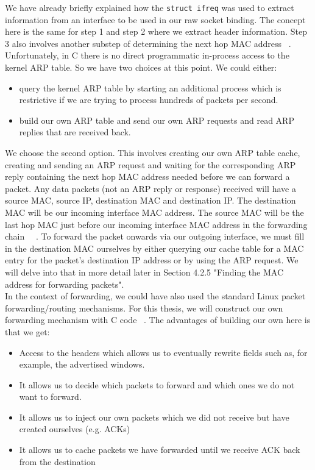 We have already briefly explained how the {\tt struct ifreq} was used to extract information from an interface to be used in our raw socket binding. The concept here is the same for step 1 and step 2 where we extract header information. Step 3 also involves another substep of determining the next hop MAC address ~\cite{40}. Unfortunately, in C there is no direct programmatic in-process access to the kernel ARP table. So we have two choices at this point. We could either:\\

\begin{itemize}
\item query the kernel ARP table by starting an additional process which is restrictive if we are trying to process hundreds of packets per second. 
\item build our own ARP table and send our own ARP requests and read ARP replies that are received back.\\
\end{itemize}

We choose the second option. This involves creating our own ARP table cache, creating and sending an ARP request and waiting for the corresponding ARP reply containing the next hop MAC address needed before we can forward a packet. Any data packets (not an ARP reply or response) received will have a source MAC, source IP, destination MAC and destination IP. The destination MAC will be our incoming interface MAC address. The source MAC will be the last hop MAC just before our incoming interface MAC address in the forwarding chain ~\cite{1}~\cite{2}. To forward the packet onwards via our outgoing interface, we must fill in the destination MAC ourselves by either querying our cache table for a MAC entry for the packet's destination IP address or by using the ARP request. We will delve into that in more detail later in Section 4.2.5 "Finding the MAC address for forwarding packets". \\

In the context of forwarding, we could have also used the standard Linux packet forwarding/routing mechanisms. For this thesis, we will construct our own forwarding mechanism with C code ~\cite{39}. The advantages of building our own here is that we get: \\

\begin{itemize}
\item Access to the headers which allows us to eventually rewrite fields such as, for example, the advertised windows.
\item It allows us to decide which packets to forward and which ones we do not want to forward. 
\item It allows us to inject our own packets which we did not receive but have created ourselves (e.g. ACKs)
\item It allows us to cache packets we have forwarded until we receive ACK back from the destination \\
\end{itemize}

